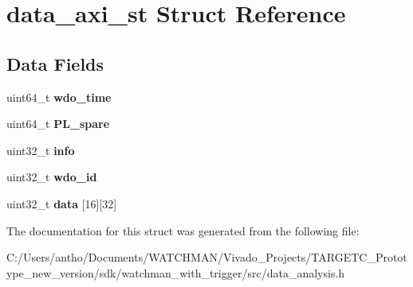 \section{data\+\_\+axi\+\_\+st Struct Reference}
\label{structdata__axi__st}
\subsection*{Data Fields}
\begin{DoxyCompactItemize}
\item 
\mbox{\label{structdata__axi__st_ad0e9cadeb03763deb31888ada41218ab}} 
uint64\+\_\+t {\bfseries wdo\+\_\+time}
\item 
\mbox{\label{structdata__axi__st_a4f3f069aeefb33818c1360ddeaec0a41}} 
uint64\+\_\+t {\bfseries P\+L\+\_\+spare}
\item 
\mbox{\label{structdata__axi__st_ab576d88e99031be3391d56e1d8c6b1e7}} 
uint32\+\_\+t {\bfseries info}
\item 
\mbox{\label{structdata__axi__st_ae7e8b9ad7f59c14e9f28823e9f34495b}} 
uint32\+\_\+t {\bfseries wdo\+\_\+id}
\item 
\mbox{\label{structdata__axi__st_a757fd0618a65f09037a72fb5a5f01088}} 
uint32\+\_\+t {\bfseries data} [16][32]
\end{DoxyCompactItemize}


The documentation for this struct was generated from the following file\+:\begin{DoxyCompactItemize}
\item 
C\+:/\+Users/antho/\+Documents/\+W\+A\+T\+C\+H\+M\+A\+N/\+Vivado\+\_\+\+Projects/\+T\+A\+R\+G\+E\+T\+C\+\_\+\+Prototype\+\_\+new\+\_\+version/sdk/watchman\+\_\+with\+\_\+trigger/src/data\+\_\+analysis.\+h\end{DoxyCompactItemize}
